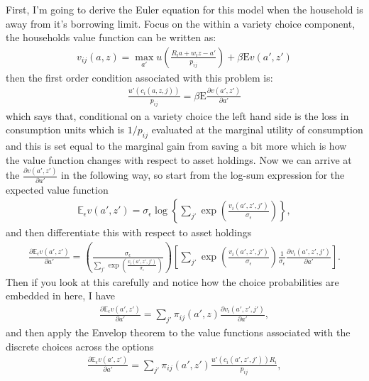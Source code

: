 \documentclass[12pt,pdftex]{article}
\begin{document}
\begin{onehalfspacing}
First, I'm going to derive the Euler equation for this model when the household is away from it's borrowing limit. Focus on the within a variety choice component, the households value function can be written as:
\begin{align}
v_{ij}(a, z) = \max_{a'} u \left( \frac{R_i a + w_i z - a'}{p_{ij}} \right) + \beta  \mathrm{E} v(a', z')
\end{align}
then the first order condition associated with this problem is:
\begin{align}
\frac{u'(c_{i}(a, z, j))}{p_{ij}} = \beta \mathrm{E} \frac{\partial v(a', z')}{\partial a'}
\end{align}
which says that, conditional on a variety choice the left hand side is the loss in consumption units which is $1 / p_{ij}$ evaluated at the marginal utility of consumption and this is set equal to the marginal gain from saving a bit more which is how the value function changes with respect to asset holdings. Now we can arrive at the $\frac{\partial v(a', z')}{\partial a'}$ in the following way, so start from the log-sum expression for the expected value function
\begin{align}
\mathbb{E}_{\epsilon} v(a', z') =  \sigma_{\epsilon} \log \left\{ \sum_{j'} \exp \left( \frac{  v_{i}(a', z', j')}{\sigma_{\epsilon}} \right) \right\},
\end{align}
and then differentiate this with respect to asset holdings
\begin{align}
\frac{\partial \mathbb{E}_{\epsilon} v(a', z')}{\partial a'} = \left( \frac{\sigma_{\epsilon}}{\sum_{j'} \exp \left( \frac{  v_{i}(a', z', j')}{\sigma_{\epsilon}}\right)} \right)
\left[ \sum_{j'} \exp \left( \frac{  v_{i}(a', z', j')}{\sigma_{\epsilon}}\right) \frac{1}{\sigma_{\epsilon}} \frac{\partial v_{i}(a', z', j')}{\partial a'}  \right].
\end{align}
Then if you look at this carefully and notice how the choice probabilities are embedded in here, I have
\begin{align}
\frac{\partial \mathbb{E}_{\epsilon} v(a', z')}{\partial a'} = \sum_{j'} \pi_{ij}(a', z) \frac{\partial v_{i}(a', z', j')}{\partial a'},
\label{apx-eq:expected-value-fun-partial}
\end{align}
and then apply the Envelop theorem to the value functions associated with the discrete choices across the options
\begin{align}
\frac{\partial \mathbb{E}_{\epsilon} v(a', z')}{\partial a'} = \sum_{j'} \pi_{ij}(a', z') \frac{u'(c_{i}(a', z', j'))R_{i}}{p_{ij}},

\end{align}
\end{onehalfspacing}
\end{document}
